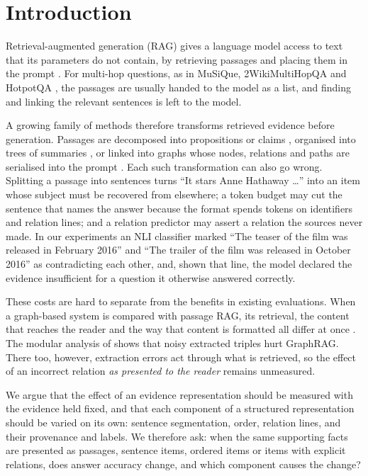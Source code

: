 \section{Introduction}
\label{sec:intro}

Retrieval-augmented generation (RAG) gives a language model access to text that its parameters do not contain, by retrieving passages and placing them in the prompt \citep{lewis2020rag}. For multi-hop questions, as in MuSiQue, 2WikiMultiHopQA and HotpotQA \citep{trivedi2022musique,ho2020twowiki,yang2018hotpotqa}, the passages are usually handed to the model as a list, and finding and linking the relevant sentences is left to the model.

A growing family of methods therefore transforms retrieved evidence before generation. Passages are decomposed into propositions or claims \citep{chen2024densex}, organised into trees of summaries \citep{sarthi2024raptor}, or linked into graphs whose nodes, relations and paths are serialised into the prompt \citep{edge2024graphrag,gutierrez2024hipporag,gutierrez2025hipporag2,zhu2025kg2rag,guo2024lightrag,chen2026pathrag}. Each such transformation can also go wrong. Splitting a passage into sentences turns ``It stars Anne Hathaway \dots'' into an item whose subject must be recovered from elsewhere; a token budget may cut the sentence that names the answer because the format spends tokens on identifiers and relation lines; and a relation predictor may assert a relation the sources never made. In our experiments an NLI classifier marked ``The teaser of the film was released in February 2016'' and ``The trailer of the film was released in October 2016'' as contradicting each other, and, shown that line, the model declared the evidence insufficient for a question it otherwise answered correctly.

These costs are hard to separate from the benefits in existing evaluations. When a graph-based system is compared with passage RAG, its retrieval, the content that reaches the reader and the way that content is formatted all differ at once \citep{xiang2026whentographs,han2025ragvsgraphrag,zhou2025indepth}. The modular analysis of \citet{nishida-etal-2026-dissecting} shows that noisy extracted triples hurt GraphRAG. There too, however, extraction errors act through what is retrieved, so the effect of an incorrect relation \emph{as presented to the reader} remains unmeasured.

We argue that the effect of an evidence representation should be measured with the evidence held fixed, and that each component of a structured representation should be varied on its own: sentence segmentation, order, relation lines, and their provenance and labels. We therefore ask: when the same supporting facts are presented as passages, sentence items, ordered items or items with explicit relations, does answer accuracy change, and which component causes the change?

